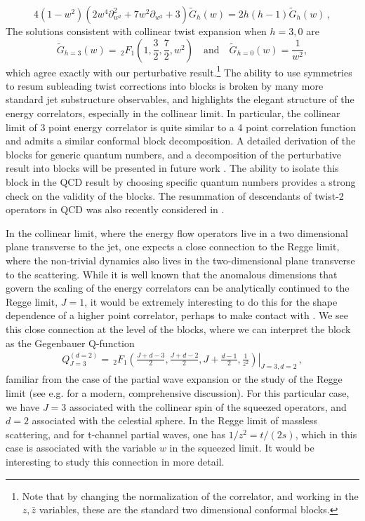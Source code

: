 \documentclass[letterpaper,11pt]{article}
\def\beq{\begin{equation}}
\def\eeq{\end{equation}}
\def\beq{\begin{equation}}
\def\eeq{\end{equation}}
\begin{document}
\beq
4(1-w^2)\left(2 w^4 \partial_{w^2}^2+7w^2 \partial_{w^2}+3 \right)\widetilde{G}_{h}(w)=2h(h-1)\widetilde{G}_{h}(w)\,,
\eeq
The solutions consistent with collinear twist expansion when $h=3,0$ are
\beq
\widetilde{G}_{h=3}(w)=\,_2F_1\left( 1, \frac{3}{2}, \frac{7}{2}, w^2\right)\quad \text{and}\quad \widetilde{G}_{h=0}(w)=\frac{1}{w^2}, \nonumber
\eeq
which agree exactly with our perturbative result.\footnote{Note that by changing the normalization of the correlator, and working in the $z,\bar z$ variables, these are the standard two dimensional conformal blocks.} The ability to use symmetries to resum subleading twist corrections into blocks is broken by many more standard jet substructure observables, and highlights the elegant structure of the energy correlators, especially in the collinear limit. In particular, the collinear limit of 3 point energy correlator is quite similar to a 4 point correlation function and  admits a similar conformal block decomposition. A detailed derivation of the blocks for generic quantum numbers, and a decomposition of the perturbative result into blocks will be presented in future work \cite{blocks:forthcoming}. The ability to isolate this block in the QCD result by choosing specific quantum numbers provides a strong check on the validity of the blocks.  The resummation of descendants of twist-2 operators in QCD was also recently considered in \cite{Braun:2020zjm}.

In the collinear limit, where the energy flow operators live in a two dimensional plane transverse to the jet, one expects a close connection to the Regge limit, where the non-trivial dynamics also lives in the two-dimensional plane transverse to the scattering. While it is well known that the anomalous dimensions that govern the scaling of the energy correlators can be analytically continued to the Regge limit, $J=1$, it would be extremely interesting to do this for the shape dependence of a higher point correlator, perhaps to make contact with 
\cite{Balitsky:2013npa,Balitsky:2015tca,Balitsky:2015oux}. We see this close connection at the level of the blocks, where we can interpret the block as the Gegenbauer Q-function
\begin{align}
Q_{J=3}^{(d=2)}=\left. \,_2F_1\left( \frac{J+d-3}{2},\frac{J+d-2}{2}, J+\frac{d-1}{2},\frac{1}{z^2}  \right)\right|_{J=3,d=2}\,,
\end{align}
familiar from the case of the partial wave expansion or the study of the Regge limit (see e.g. \cite{Correia:2020xtr} for a modern, comprehensive discussion). For this particular case, we have $J=3$ associated with the collinear spin of the squeezed operators, and $d=2$ associated with the celestial sphere. In the Regge limit of massless scattering, and for t-channel partial waves, one has $1/z^2=t/(2s)$, which in this case is associated with the variable $w$ in the squeezed limit. It would be interesting to study this connection in more detail. 
\end{document}
